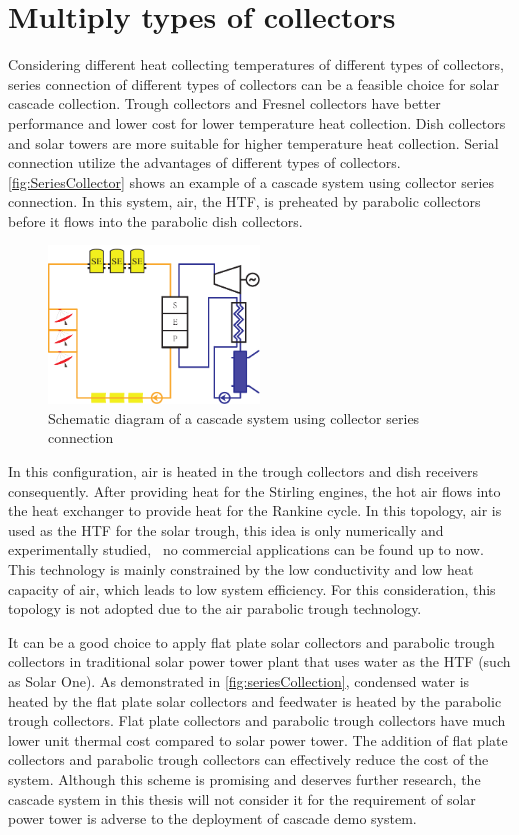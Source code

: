 \section{Multiply types of collectors}

Considering different heat collecting temperatures of different types of collectors, series connection of different types of collectors can be a feasible choice for solar cascade collection. Trough collectors and Fresnel collectors have better performance and lower cost for lower temperature heat collection. Dish collectors and solar towers are more suitable for higher temperature heat collection. Serial connection utilize the advantages of different types of collectors. \autoref{fig:SeriesCollector} shows an example of a cascade system using collector series connection. In this system, air, the HTF, is preheated by parabolic collectors before it flows into the parabolic dish collectors.

\begin{figure}[!ht]
\centering 
\includegraphics[width=0.5\textwidth]{fig/SeriesCollector}
\caption{Schematic diagram of a cascade system using collector series connection}\label{fig:SeriesCollector}
\end{figure}

In this configuration, air is heated in the trough collectors and dish receivers consequently. After providing heat for the Stirling engines, the hot air flows into the heat exchanger to provide heat for the Rankine cycle. In this topology, air is used as the HTF for the solar trough, this idea is only numerically and experimentally studied,~\cite{Good2015,Good2016} no commercial applications can be found up to now. This technology is mainly constrained by the low conductivity and low heat capacity of air, which leads to low system efficiency. For this consideration, this topology is not adopted due to the air parabolic trough technology.

It can be a good choice to apply flat plate solar collectors and parabolic trough collectors in traditional solar power tower plant that uses water as the HTF (such as Solar One). As demonstrated in \autoref{fig:seriesCollection}, condensed water is heated by the flat plate solar collectors and feedwater is heated by the parabolic trough collectors. Flat plate collectors and parabolic trough collectors have much lower unit thermal cost compared to solar power tower. The addition of flat plate collectors and parabolic trough collectors can effectively reduce the cost of the system. Although this scheme is promising and deserves further research, the cascade system in this thesis will not consider it for the requirement of solar power tower is adverse to the deployment of cascade demo system.

